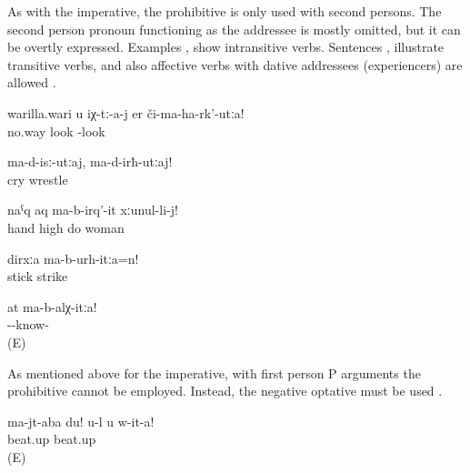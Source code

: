 As with the imperative, the prohibitive is only used with second persons. The second person pronoun functioning as the addressee is mostly omitted, but it can be overtly expressed. Examples ,  show intransitive verbs. Sentences ,  illustrate transitive verbs, and also affective verbs with dative addressees (experiencers) are allowed .
%
\begin{exe}
	\ex	\label{ex:No way you look at them}
	\gll	warilla.wari	u	iχ-tː-a-j	er	či-ma-ha-rk'-utːa!\\
		no.way			look	-look\\
	\glt	{}

	\ex	\label{ex:Do not cry, do not wrestle}
	\gll	ma-d-isː-utːaj,		ma-d-irħ-utːaj!\\
		cry	wrestle\\
	\glt	{}

	\ex	\label{ex:Do not raise your hand against your wife}
	\gll	naˁq	aq	ma-b-irq'-it	xːunul-li-j!\\
		hand	high	do	woman\\
	\glt	{}

	\ex	\label{ex:Do not hit with a stick}
	\gll	dirxːa	ma-b-urh-itːa=n!\\
		stick	strike\\
	\glt	{}

	\ex	\label{ex:Do not know this}
	\gll	at	ma-b-alχ-itːa!\\
			--know-\\
	\glt	{} (E)
\end{exe}

As mentioned above for the imperative, with first person P arguments the prohibitive cannot be employed. Instead, the negative optative must be used .
%
\begin{exe}
	\ex	\label{ex:‎Do not thrash me}
	\gll	ma-jt-aba	du!	u-l	u	w-it-a!\\
		beat.up				beat.up\\
	\glt	{} (E)
\end{exe}

